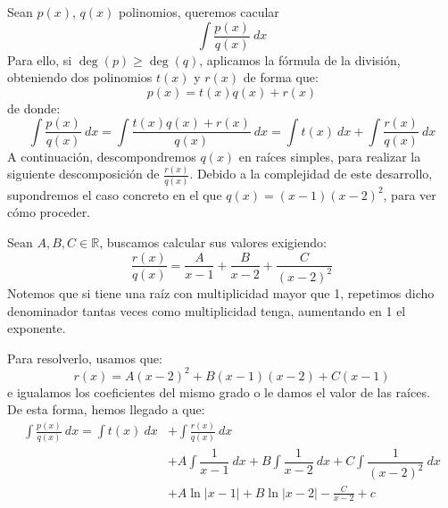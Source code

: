 \noindent
Sean $p(x)$, $q(x)$ polinomios, queremos cacular
\begin{equation*}
    \displaystyle\int \frac{p(x)}{q(x)}~dx 
\end{equation*}
Para ello, si $\deg(p) \geq \deg(q)$, aplicamos la fórmula de la división, obteniendo dos polinomios $t(x)$ y $r(x)$ de forma que:
\begin{equation*}
    p(x) = t(x)q(x) + r(x)
\end{equation*}
de donde:
\begin{equation*}
    \displaystyle\int \frac{p(x)}{q(x)}~dx  = \displaystyle\int \frac{t(x)q(x)+r(x)}{q(x)}~dx = \displaystyle\int t(x)~dx  + \displaystyle\int \frac{r(x)}{q(x)}~dx 
\end{equation*}
A continuación, descompondremos $q(x)$ en raíces simples, para realizar la siguiente descomposición de $\frac{r(x)}{q(x)}$. Debido a la complejidad de este desarrollo, supondremos el caso concreto en el que $q(x) = (x-1){(x-2)}^2$, para ver cómo proceder.

Sean $A,B,C\in \mathbb{R}$, buscamos calcular sus valores exigiendo:
\begin{equation*}
    \dfrac{r(x)}{q(x)} = \dfrac{A}{x-1} + \dfrac{B}{x-2} + \dfrac{C}{{(x-2)}^{2}}
\end{equation*}
Notemos que si tiene una raíz con multiplicidad mayor que 1, repetimos dicho denominador tantas veces como multiplicidad tenga, aumentando en 1 el exponente.

Para resolverlo, usamos que:
\begin{equation*}
    r(x) = A{(x-2)}^{2} + B(x-1)(x-2) + C(x-1)
\end{equation*}
e igualamos los coeficientes del mismo grado o le damos el valor de las raíces.\\

\noindent
De esta forma, hemos llegado a que:
\begin{align*}
    \displaystyle\int \frac{p(x)}{q(x)}~dx  = \displaystyle\int t(x)~dx  &+ \displaystyle\int \frac{r(x)}{q(x)}~dx  \\
                                            &+ A \displaystyle\int \dfrac{1}{x-1}~dx  + B\displaystyle\int \dfrac{1}{x-2}~dx  + C\displaystyle\int \dfrac{1}{{(x-2)}^{2}}~dx \\
                                            &+ A\ln|x-1| + B\ln|x-2| -\frac{C}{x-2} + c
\end{align*}

